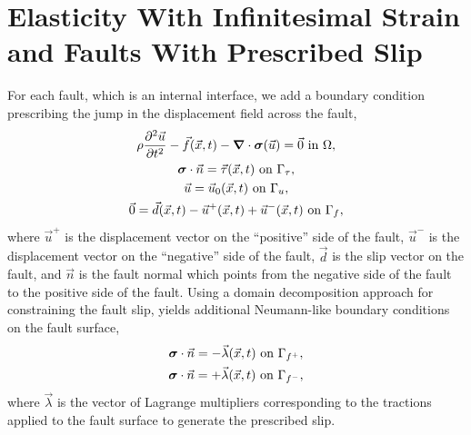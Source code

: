 \section{Elasticity With Infinitesimal Strain and Faults With Prescribed Slip}

For each fault, which is an internal interface, we add a boundary
condition prescribing the jump in the displacement field across the
fault,
\begin{gather}
  \rho \frac{\partial^2\vec{u}}{\partial t^2} - \vec{f}(\vec{x},t) - \tensor{\nabla} \cdot 
\tensor{\sigma}
(\vec{u}) = \vec{0} \text{ in }\Omega, \\
%
  \tensor{\sigma} \cdot \vec{n} = \vec{\tau}(\vec{x},t) \text{ on }\Gamma_\tau, \\
%
  \vec{u} = \vec{u}_0(\vec{x},t) \text{ on }\Gamma_u, \\
%
  \label{eqn:bc:prescribed_slip}
  \vec{0} = \vec{d}(\vec{x},t) - \vec{u}^+(\vec{x},t) + \vec{u}^-(\vec{x},t) \text{ on }\Gamma_f,
\end{gather}
where $\vec{u}^+$ is the displacement vector on the ``positive'' side
of the fault, $\vec{u}^-$ is the displacement vector on the ``negative''
side of the fault, $\vec{d}$ is the slip vector on the fault, and
$\vec{n}$ is the fault normal which points from the negative side of
the fault to the positive side of the fault. Using a domain
decomposition approach for constraining the fault slip, yields
additional Neumann-like boundary conditions on the fault surface,
\begin{gather}
  \bm{\sigma} \cdot \vec{n} = -\vec{\lambda}(\vec{x},t) \text{ on }\Gamma_{f^+}, \\
  \bm{\sigma} \cdot \vec{n} = +\vec{\lambda}(\vec{x},t) \text{ on }\Gamma_{f^-},
\end{gather}
where $\vec{\lambda}$ is the vector of Lagrange multipliers
corresponding to the tractions applied to the fault surface to
generate the prescribed slip.

